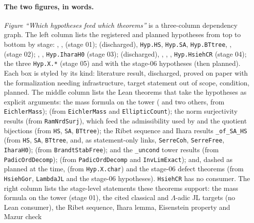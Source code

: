 \paragraph{The two figures, in words.} \emph{Figure ``Which hypotheses feed which theorems''} is a three-column dependency
graph. The left column lists the registered and planned hypotheses from top to bottom by stage: ,
,  (stage 01);  (discharged), \texttt{Hyp.HS}, \texttt{Hyp.SA},
\texttt{Hyp.BTtree}, ,  (stage 02); , ,
\texttt{Hyp.IharaH0} (stage 03);  (discharged), , ,
, \texttt{Hyp.HsiehCR} (stage 04); the three \texttt{Hyp.X.*} (stage 05) and  with the
stage-06 hypotheses (then planned). Each box is styled by its kind: literature result, discharged, proved on paper with the
formalization needing infrastructure, target statement out of scope, condition, planned. The middle column lists the Lean
theorems that take the hypotheses as explicit arguments: the mass formula on the tower ( and two
others, from \texttt{EichlerMass});  (from \texttt{EichlerMass} and \texttt{EllipticCount}); the norm
surjectivity results (from \texttt{RamNrdSurj}), which feed the admissibility used by  and the
quotient bijections (from \texttt{HS}, \texttt{SA}, \texttt{BTtree}); the Ribet sequence and Ihara results \texttt{\_of\_SA\_HS} (from
\texttt{HS}, \texttt{SA}, \texttt{BTtree}, and, as statement-only links, \texttt{SerreCoh}, \texttt{SerreFree}, \texttt{IharaH0});
 (from \texttt{BrandtStabFree});  and the
\texttt{\_uncond} tower results (from \texttt{PadicOrdDecomp});  (from \texttt{PadicOrdDecomp} and
\texttt{InvLimExact}); and, dashed as planned at the time,  (from \texttt{Hyp.X.char}) and the stage-06
defect theorems (from \texttt{HsiehGor}, \texttt{LambdaJL} and the stage-06 hypotheses). \texttt{HsiehCR} has no consumer. The
right column lists the stage-level statements these theorems support: the mass formula on the tower (stage 01), the cited
classical and $\Lambda$-adic JL targets (no Lean consumer), the Ribet sequence, Ihara lemma, Eisenstein property and Mazur check
